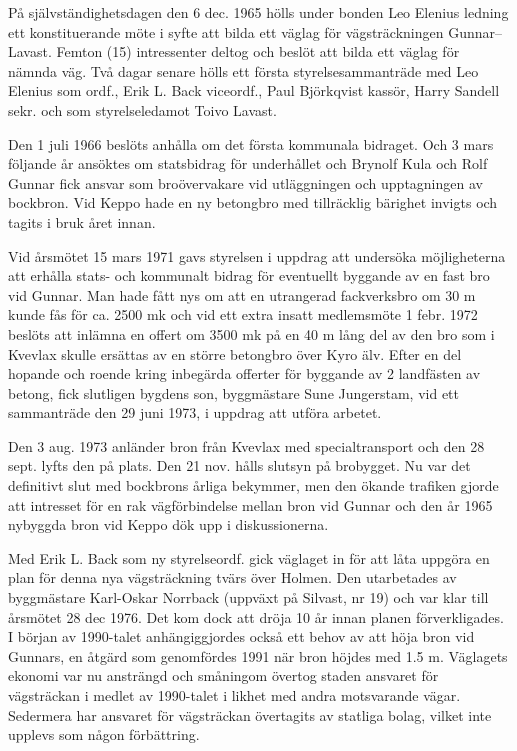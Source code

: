 På självständighetsdagen den 6 dec. 1965 hölls under bonden Leo Elenius ledning ett konstituerande möte i syfte att bilda ett väglag för vägsträckningen Gunnar--Lavast. Femton (15) intressenter deltog och beslöt att bilda ett väglag för nämnda väg. Två dagar senare hölls ett första styrelsesammanträde med Leo Elenius som ordf., Erik L. Back viceordf., Paul Björkqvist kassör, Harry Sandell sekr. och som styrelseledamot Toivo Lavast.

Den 1 juli 1966 beslöts anhålla om det första kommunala bidraget. Och 3 mars följande år ansöktes om statsbidrag för underhållet och Brynolf Kula och Rolf Gunnar fick ansvar som broövervakare vid utläggningen och upptagningen av bockbron. Vid Keppo hade en ny betongbro med tillräcklig bärighet invigts och tagits i bruk året innan.


Vid årsmötet 15 mars 1971 gavs styrelsen i uppdrag att undersöka möjligheterna att erhålla stats- och kommunalt bidrag för eventuellt byggande av en fast bro vid Gunnar. Man hade fått nys om att en utrangerad fackverksbro om 30 m kunde fås för ca. 2500 mk och vid ett extra insatt medlemsmöte 1 febr. 1972 beslöts att inlämna en offert om 3500 mk på en 40 m lång del av den bro som i Kvevlax skulle ersättas av en större  betongbro över Kyro älv. Efter en del hopande och roende kring inbegärda offerter för byggande av 2 landfästen av betong, fick slutligen bygdens son, byggmästare Sune Jungerstam, vid ett sammanträde den 29 juni 1973, i uppdrag att utföra arbetet.

Den 3 aug. 1973 anländer bron från Kvevlax med specialtransport och den 28 sept. lyfts den på plats. Den 21 nov. hålls slutsyn på brobygget. Nu var det definitivt slut med bockbrons årliga bekymmer, men den ökande trafiken gjorde att intresset för en rak vägförbindelse mellan bron vid Gunnar och den år 1965 nybyggda bron vid Keppo dök upp i diskussionerna.

Med Erik L. Back som ny styrelseordf. gick väglaget in för att låta uppgöra en plan för denna nya vägsträckning tvärs över Holmen. Den utarbetades av byggmästare Karl-Oskar Norrback (uppväxt på Silvast, nr 19) och var klar till årsmötet 28 dec 1976. Det kom dock att dröja 10 år innan planen förverkligades. I början av 1990-talet anhängiggjordes också ett behov av att höja bron vid Gunnars, en åtgärd som genomfördes 1991 när bron höjdes med 1.5 m. Väglagets ekonomi var nu ansträngd och småningom övertog staden ansvaret för vägsträckan i medlet av 1990-talet i likhet med andra motsvarande vägar. Sedermera har ansvaret för vägsträckan övertagits av statliga bolag, vilket inte upplevs som någon förbättring.



